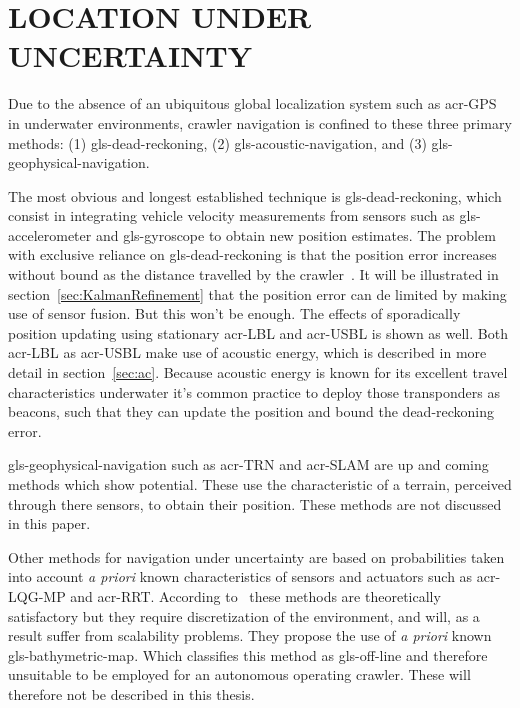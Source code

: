 

\section{LOCATION UNDER UNCERTAINTY}\label{sec:coverageunderuncertainty}

Due to the absence of an ubiquitous global localization system such as \gls{acr-GPS} in underwater environments, crawler
navigation is confined to these three primary methods: (1) \gls{gls-dead-reckoning}, (2) \gls{gls-acoustic-navigation},
and (3) \gls{gls-geophysical-navigation}.

The most obvious and longest established technique is \gls{gls-dead-reckoning}, which consist in integrating vehicle
velocity measurements from sensors such as \gls{gls-accelerometer} and \gls{gls-gyroscope} to obtain new position
estimates. The problem with exclusive reliance on \gls{gls-dead-reckoning} is that the position error increases without
bound as the distance travelled by the crawler~\cite{galceran_coverage_2014}. It will be illustrated in
section~\ref{sec:KalmanRefinement} that the position error can de limited by making use of sensor fusion. But this won't
be enough. The effects of sporadically position updating using stationary \gls{acr-LBL} and \gls{acr-USBL}
is shown as well. Both \gls{acr-LBL} as \gls{acr-USBL} make use of acoustic energy, which is described in more detail in
section~\ref{sec:ac}. Because acoustic energy is known for its excellent travel characteristics underwater it's common
practice to deploy those transponders as beacons, such that they can update the position and bound the dead-reckoning
error.

\gls{gls-geophysical-navigation} such as \gls{acr-TRN} and \gls{acr-SLAM} are up and coming methods which
show potential. These use the characteristic of a terrain, perceived through there sensors, to obtain their position.
These methods are not discussed in this paper.

Other methods for navigation under uncertainty are based on probabilities taken into account \emph{a priori} known
characteristics of sensors and actuators such as \gls{acr-LQG-MP} and \gls{acr-RRT}. According
to~\citet{galceran_uncertainty_driven_2013} these methods are theoretically satisfactory but they require discretization
of the environment, and will, as a result suffer from scalability problems. They propose the use of \emph{a priori}
known \gls{gls-bathymetric-map}. Which classifies this method as \gls{gls-off-line} and therefore unsuitable to
be employed for an autonomous operating crawler. These will therefore not be described in this thesis.

